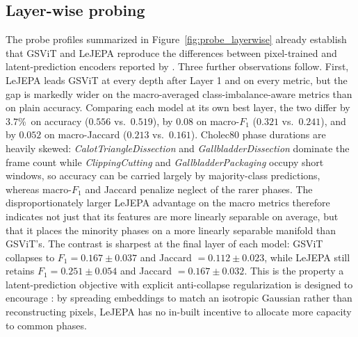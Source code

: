 \documentclass[11pt, a4paper]{article}
\begin{document}
\subsection{Layer-wise probing}
The probe profiles summarized in Figure~\ref{fig:probe_layerwise} already
establish that GSViT and LeJEPA reproduce the differences between
pixel-trained and latent-prediction encoders reported by
\textcite{joseph-2026}. Three further observations follow. First, LeJEPA leads GSViT at every depth after Layer 1 and on every metric, but the gap is markedly wider on the macro-averaged class-imbalance-aware metrics than on plain accuracy. Comparing each model at its own best layer, the
two differ by $3.7$\%\ on accuracy ($0.556$ vs.\ $0.519$), by $0.08$ on macro-$F_1$ ($0.321$ vs.\ $0.241$), and by $0.052$ on macro-Jaccard ($0.213$ vs.\
$0.161$). Cholec80 phase durations are heavily
skewed: \emph{CalotTriangleDissection} and \emph{GallbladderDissection}
dominate the frame count while \emph{ClippingCutting} and
\emph{GallbladderPackaging} occupy short windows, so accuracy can be
carried largely by majority-class predictions, whereas macro-$F_1$ and
Jaccard penalize neglect of the rarer phases. The disproportionately
larger LeJEPA advantage on the macro metrics therefore indicates not
just that its features are more linearly separable on average, but that
it places the minority phases on a more linearly separable manifold than
GSViT's. The contrast is sharpest at the final layer of each model:
GSViT collapses to $F_1 = 0.167 \pm 0.037$ and Jaccard $= 0.112 \pm 0.023$,
while LeJEPA still retains $F_1 = 0.251 \pm 0.054$ and Jaccard $= 0.167
\pm 0.032$. This is the property a latent-prediction objective with explicit
anti-collapse regularization is designed to encourage
\parencite{balestriero-2025}: by spreading embeddings to match an
isotropic Gaussian rather than reconstructing pixels, LeJEPA has no
in-built incentive to allocate more capacity to common phases.
\end{document}
